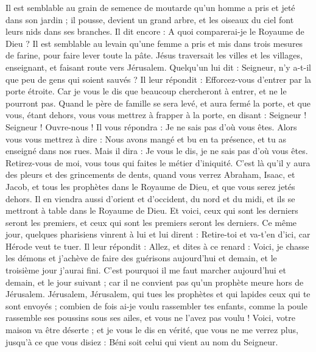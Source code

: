 \begin{multicols}{2}
Il est semblable au grain de semence de moutarde qu'un homme a pris et jeté dans son jardin ; il pousse, devient un grand arbre, et les oiseaux du ciel font leurs nids dans ses branches.
Il dit encore : A quoi comparerai-je le Royaume de Dieu ?
Il est semblable au levain qu'une femme a pris et mis dans trois mesures de farine, pour faire lever toute la pâte.
Jésus traversait les villes et les villages, enseignant, et faisant route vers Jérusalem.
Quelqu’un lui dit : Seigneur, n'y a-t-il que peu de gens qui soient sauvés ? Il leur répondit :
Efforcez-vous d’entrer par la porte étroite. Car je vous le dis que beaucoup chercheront à entrer, et ne le pourront pas.
Quand le père de famille se sera levé, et aura fermé la porte, et que vous, étant dehors, vous vous mettrez à frapper à la porte, en disant : Seigneur ! Seigneur ! Ouvre-nous ! Il vous répondra : Je ne sais pas d'où vous êtes.
Alors vous vous mettrez à dire : Nous avons mangé et bu en ta présence, et tu as enseigné dans nos rues.
Mais il dira : Je vous le dis, je ne sais pas d'où vous êtes. Retirez-vous de moi, vous tous qui faites le métier d'iniquité.
C’est là qu’il y aura des pleurs et des grincements de dents, quand vous verrez Abraham, Isaac, et Jacob, et tous les prophètes dans le Royaume de Dieu, et que vous serez jetés dehors.
Il en viendra aussi d'orient et d'occident, du nord et du midi, et ils se mettront à table dans le Royaume de Dieu.
Et voici, ceux qui sont les derniers seront les premiers, et ceux qui sont les premiers seront les derniers.
Ce même jour, quelques pharisiens vinrent à lui et lui dirent : Retire-toi et va-t’en d'ici, car Hérode veut te tuer.
Il leur répondit : Allez, et dites à ce renard : Voici, je chasse les démons et j'achève de faire des guérisons aujourd'hui et demain, et le troisième jour j’aurai fini.
C'est pourquoi il me faut marcher aujourd'hui et demain, et le jour suivant ; car il ne convient pas qu'un prophète meure hors de Jérusalem.
\TextTitle{[grandeur]}
Jérusalem, Jérusalem, qui tues les prophètes et qui lapides ceux qui te sont envoyés ; combien de fois ai-je voulu rassembler tes enfants, comme la poule rassemble ses poussins sous ses ailes, et vous ne l'avez pas voulu !
Voici, votre maison va être déserte ; et je vous le dis en vérité, que vous ne me verrez plus, jusqu'à ce que vous disiez : Béni soit celui qui vient au nom du Seigneur.

\end{multicols}
